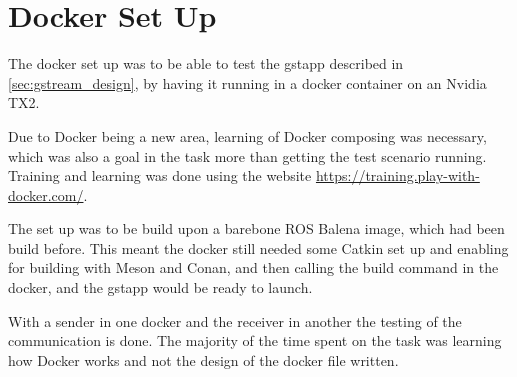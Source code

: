 \section{Docker Set Up}
The docker set up was to be able to test the \gls{gstapp} described in \autoref{sec:gstream_design}, by having it running in a docker container on an Nvidia TX2.

Due to Docker being a new area, learning of Docker composing was necessary, which was also a goal in the task more than getting the test scenario running. Training and learning was done using the website \url{https://training.play-with-docker.com/}.

The set up was to be build upon a barebone ROS Balena image, which had been build before. This meant the docker still needed some Catkin set up and enabling for building with Meson and Conan, and then calling the build command in the docker, and the \gls{gstapp} would be ready to launch. 

With a sender in one docker and the receiver in another the testing of the communication is done. The majority of the time spent on the task was learning how Docker works and not the design of the docker file written.